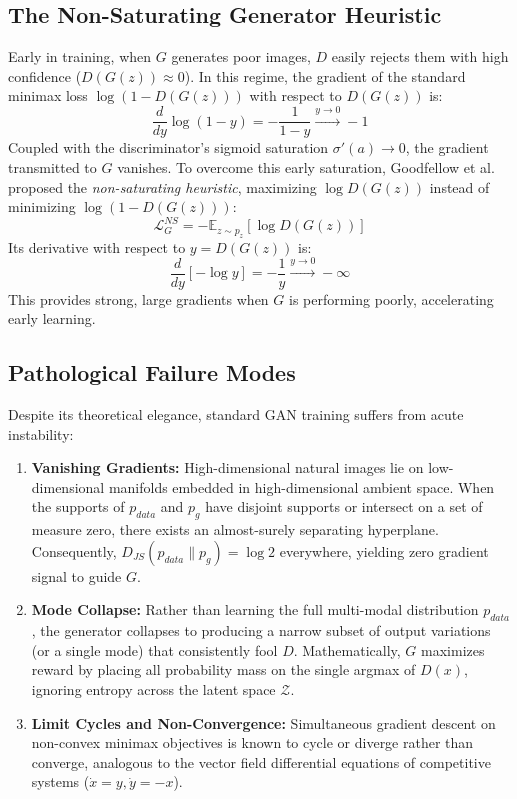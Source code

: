 \documentclass[conference]{IEEEtran}
\begin{document}
\subsection{The Non-Saturating Generator Heuristic}
Early in training, when $G$ generates poor images, $D$ easily rejects them with high confidence ($D(G(z)) \approx 0$). In this regime, the gradient of the standard minimax loss $\log(1 - D(G(z)))$ with respect to $D(G(z))$ is:
\begin{equation}
\frac{d}{dy} \log(1 - y) = -\frac{1}{1 - y} \xrightarrow{y \to 0} -1
\end{equation}
Coupled with the discriminator's sigmoid saturation $\sigma'(a) \to 0$, the gradient transmitted to $G$ vanishes. To overcome this early saturation, Goodfellow et al. proposed the \textit{non-saturating heuristic}, maximizing $\log D(G(z))$ instead of minimizing $\log(1 - D(G(z)))$:
\begin{equation}
\mathcal{L}_G^{NS} = -\mathbb{E}_{z \sim p_z}[\log D(G(z))]
\end{equation}
Its derivative with respect to $y = D(G(z))$ is:
\begin{equation}
\frac{d}{dy} [-\log y] = -\frac{1}{y} \xrightarrow{y \to 0} -\infty
\end{equation}
This provides strong, large gradients when $G$ is performing poorly, accelerating early learning.

\subsection{Pathological Failure Modes}
Despite its theoretical elegance, standard GAN training suffers from acute instability:
\begin{enumerate}
    \item \textbf{Vanishing Gradients:} High-dimensional natural images lie on low-dimensional manifolds embedded in high-dimensional ambient space. When the supports of $p_{data}$ and $p_g$ have disjoint supports or intersect on a set of measure zero, there exists an almost-surely separating hyperplane. Consequently, $D_{JS}(p_{data} \parallel p_g) = \log 2$ everywhere, yielding zero gradient signal to guide $G$.
    \item \textbf{Mode Collapse:} Rather than learning the full multi-modal distribution $p_{data}$, the generator collapses to producing a narrow subset of output variations (or a single mode) that consistently fool $D$. Mathematically, $G$ maximizes reward by placing all probability mass on the single argmax of $D(x)$, ignoring entropy across the latent space $\mathcal{Z}$.
    \item \textbf{Limit Cycles and Non-Convergence:} Simultaneous gradient descent on non-convex minimax objectives is known to cycle or diverge rather than converge, analogous to the vector field differential equations of competitive systems ($\dot{x} = y, \dot{y} = -x$).
\end{enumerate}
\end{document}
